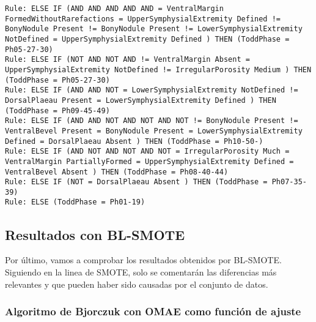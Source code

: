 \begin{lstlisting}
Rule: ELSE IF (AND AND AND AND AND = VentralMargin FormedWithoutRarefactions = UpperSymphysialExtremity Defined != BonyNodule Present != BonyNodule Present != LowerSymphysialExtremity NotDefined = UpperSymphysialExtremity Defined ) THEN (ToddPhase = Ph05-27-30)
Rule: ELSE IF (NOT AND NOT AND != VentralMargin Absent = UpperSymphysialExtremity NotDefined != IrregularPorosity Medium ) THEN (ToddPhase = Ph05-27-30)
Rule: ELSE IF (AND AND NOT = LowerSymphysialExtremity NotDefined != DorsalPlaeau Present = LowerSymphysialExtremity Defined ) THEN (ToddPhase = Ph09-45-49)
Rule: ELSE IF (AND AND NOT AND NOT AND NOT != BonyNodule Present != VentralBevel Present = BonyNodule Present = LowerSymphysialExtremity Defined = DorsalPlaeau Absent ) THEN (ToddPhase = Ph10-50-)
Rule: ELSE IF (AND NOT AND NOT AND NOT = IrregularPorosity Much = VentralMargin PartiallyFormed = UpperSymphysialExtremity Defined = VentralBevel Absent ) THEN (ToddPhase = Ph08-40-44)
Rule: ELSE IF (NOT = DorsalPlaeau Absent ) THEN (ToddPhase = Ph07-35-39)
Rule: ELSE (ToddPhase = Ph01-19)
\end{lstlisting}

\newpage


\subsection{Resultados con BL-SMOTE}

Por último, vamos a comprobar los resultados obtenidos por BL-SMOTE. Siguiendo en la linea de SMOTE, solo se comentarán las diferencias más relevantes y que pueden haber sido causadas por el conjunto de datos.

\subsubsection{Algoritmo de Bjorczuk con OMAE como función de ajuste}

